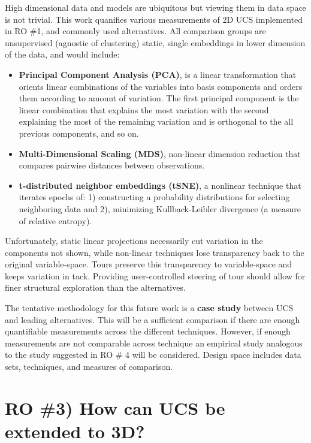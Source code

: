 \documentclass{monashthesis}
\begin{document}
High dimensional data and models are ubiquitous but viewing them in data
space is not trivial. This work quanifies various measurements of 2D UCS
implemented in RO \#1, and commonly used alternatives. All comparison
groups are unsupervised (agnostic of clustering) static, single
embeddings in lower dimension of the data, and would include:

\begin{itemize}
\tightlist
\item
  \textbf{Principal Component Analysis (PCA)}, is a linear
  transformation that orients linear combinations of the variables into
  basis components and orders them according to amount of variation. The
  first principal component is the linear combination that explains the
  most variation with the second explaining the most of the remaining
  variation and is orthogonal to the all previous components, and so on.
\item
  \textbf{Multi-Dimensional Scaling (MDS)}, non-linear dimension
  reduction that compares pairwise distances between observations.
\item
  \textbf{t-distributed neighbor embeddings (tSNE)}, a nonlinear
  technique that iterates epochs of: 1) constructing a probability
  distributions for selecting neighboring data and 2), minimizing
  Kullback-Leibler divergence (a measure of relative entropy).
\end{itemize}

Unfortunately, static linear projections necessarily cut variation in
the components not shown, while non-linear techniques lose transparency
back to the original variable-space. Tours preserve this transparency to
variable-space and keeps variation in tack. Providing user-controlled
steering of tour should allow for finer structural exploration than the
alternatives.

The tentative methodology for this future work is a \textbf{case study}
between UCS and leading alternatives. This will be a sufficient
comparison if there are enough quantifiable measurements across the
different techniques. However, if enough measurements are not comparable
across technique an empirical study analogous to the study suggested in
RO \# 4 will be considered. Design space includes data sets, techniques,
and measures of comparison.

\section{RO \#3) How can UCS be extended to
3D?}\label{ro-3-how-can-ucs-be-extended-to-3d}
\end{document}
